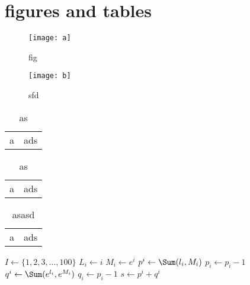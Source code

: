 \chapter{figures and tables}
\begin{figure}[H]
  \centering
  \texttt{[image: a]}
  \caption{fig}
\end{figure}
\begin{figure}[H]
  \centering
  \texttt{[image: b]}
  \caption{sfd}
\end{figure}
\begin{table}[H]
  \centering
  \begin{tabular}{rl}
    a&ads
  \end{tabular}
  \caption{as}
\end{table}
\begin{table}[H]
  \centering
  \begin{tabular}{rl}
    a&ads
  \end{tabular}
  \caption{as}
\end{table}

\begin{table}[H]
  \centering
  \begin{tabular}{rl}
    a&ads
  \end{tabular}
  \caption{asasd}
\end{table}
\begin{Algorithm}[H]
    \BlankLine
    \BlankLine
    $I\gets \{1,2,3,\ldots,100\}$ \;
    \BlankLine
    {%
        $L_i \gets i$ \;
        $M_i \gets e^i$ \;
    }
    \BlankLine
    {%
         $p^i \gets \Sum( l_i,M_i)$ \;
        {%
            $p_i\gets p_i-1$ \;
        }
    }
    \BlankLine
    {%
        $q^i \gets \Sum(e^{l_i},e^{M_i})$ \;
        {%
            $q_i\gets p_i-1$ \;
        }
    }
     $s\gets p^i+q^i$
    \caption{A example of the algorithms}
    \label{algo:Ch6-ShapeGen}
\end{Algorithm}
